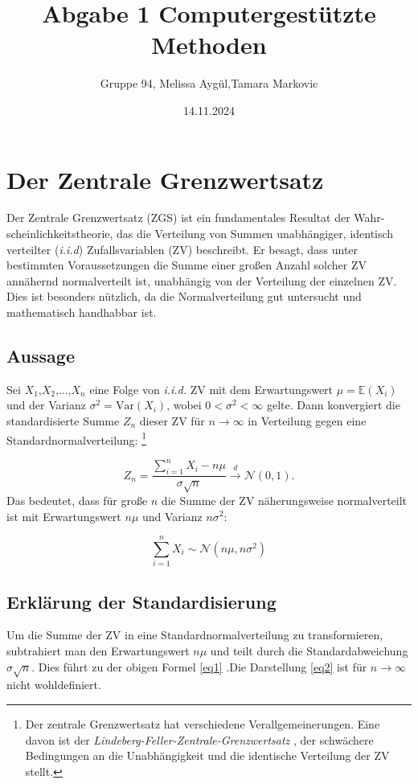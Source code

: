 \documentclass{article}
\title{Abgabe 1 Computergestützte Methoden}
\author{Gruppe 94, Melissa Aygül,Tamara Markovic}
\date{14.11.2024}
\begin{document}
\maketitle
\tableofcontents
\newpage

\section{Der Zentrale Grenzwertsatz}
Der Zentrale Grenzwertsatz (ZGS) ist ein fundamentales Resultat der Wahr-
scheinlichkeitstheorie, das die Verteilung von Summen unabhängiger, identisch verteilter (\textit{i.i.d}) Zufallsvariablen (ZV) beschreibt. Er besagt, dass unter bestimmten Voraussetzungen die Summe einer großen Anzahl solcher ZV annähernd normalverteilt ist, unabhängig von der Verteilung der einzelnen ZV. Dies ist besonders nützlich, da die Normalverteilung gut untersucht und mathematisch handhabbar ist.

\subsection{Aussage}
Sei $X_1$,$X_2$,...,$X_n$ eine Folge von \textit{i.i.d.} ZV mit dem Erwartungswert $\mu = \mathbb{E}(X_i)$ und der Varianz $\sigma^2 = \text{Var}(X_i)$, wobei $0 < \sigma^2 < \infty$ gelte. Dann konvergiert
die standardisierte Summe $Z_n$ dieser ZV für $n \to \infty$
in Verteilung gegen eine Standardnormalverteilung:
\footnote{Der zentrale Grenzwertsatz hat verschiedene Verallgemeinerungen. Eine davon ist der 
\textit{Lindeberg-Feller-Zentrale-Grenzwertsatz} \cite[Seite 328]{Klenke}, der schwächere Bedingungen an die Unabhängigkeit 
und die identische Verteilung der ZV stellt.}

\begin{equation}
Z_n = \frac{\sum_{i=1}^n X_i - n\mu}{\sigma\sqrt{n}} \overset{d}{\to} \mathcal{N}(0, 1).
\label{eq1}
\end{equation}
Das bedeutet, dass für große $n$ die Summe der ZV näherungsweise normalverteilt ist 
mit Erwartungswert $n\mu$ und Varianz $n\sigma^2$:

\begin{equation}
\sum_{i=1}^n X_i \sim \mathcal{N}(n\mu, n\sigma^2)
\label{eq2}
\end{equation}

\subsection{Erklärung der Standardisierung}
Um die Summe der ZV in eine Standardnormalverteilung zu transformieren, subtrahiert man den Erwartungswert $n\mu$ und teilt durch die Standardabweichung $\sigma\sqrt{n}$. Dies führt zu der obigen Formel \eqref{eq1} .Die Darstellung \eqref{eq2} ist für
$n \to \infty$ nicht wohldefiniert.
\end{document}
